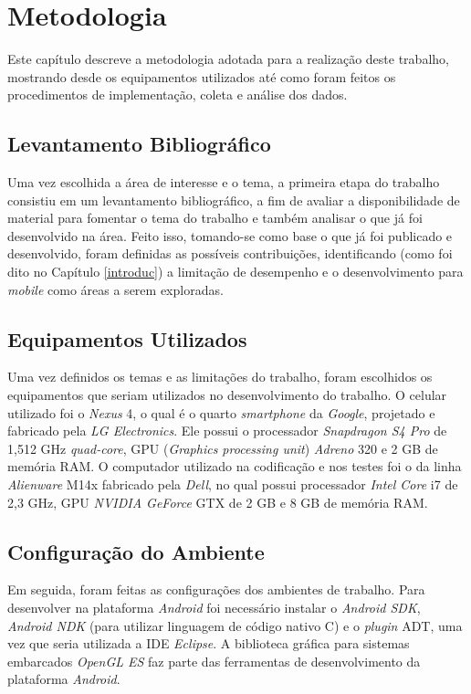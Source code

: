 \chapter[Metodologia]{Metodologia}

	Este capítulo descreve a metodologia adotada para a realização deste trabalho, mostrando desde os equipamentos utilizados até como foram feitos os procedimentos de implementação, coleta e análise dos dados. 

\section{Levantamento Bibliográfico}

Uma vez escolhida a área de interesse e o tema, a primeira etapa do trabalho consistiu em um levantamento bibliográfico, a fim de avaliar a disponibilidade de material para fomentar o tema do trabalho e também analisar o que já foi desenvolvido na área. Feito isso, tomando-se como base o que já foi publicado e desenvolvido, foram definidas as possíveis contribuições, identificando (como foi dito no Capítulo \ref{introduc}) a limitação de desempenho e o desenvolvimento para \textit{mobile} como áreas a serem exploradas.  

\section{Equipamentos Utilizados}

	Uma vez definidos os temas e as limitações do trabalho, foram escolhidos os equipamentos que seriam utilizados no desenvolvimento do trabalho. O celular utilizado foi o \textit{Nexus} 4, o qual é o quarto  \textit{smartphone} da  \textit{Google}, projetado e fabricado pela \textit{LG Electronics}.  Ele possui o processador \textit{Snapdragon S4 Pro} de 1,512 GHz \textit{quad-core}, GPU (\textit{Graphics processing unit}) \textit{Adreno} 320 e 2 GB de memória RAM. O computador utilizado na codificação e nos testes foi o da linha \textit{Alienware} M14x fabricado pela \textit{Dell}, no qual possui processador \textit{Intel Core} i7 de 2,3 GHz, GPU \textit{NVIDIA GeForce} GTX de 2 GB e 8 GB de memória RAM. 

\section{Configuração do Ambiente}
\label{configamb}	

	Em seguida, foram feitas as configurações dos ambientes de trabalho. Para desenvolver na plataforma \textit{Android} foi necessário instalar o \textit{Android SDK}, \textit{Android NDK} (para utilizar linguagem de código nativo C) e o \textit{plugin} ADT, uma vez que seria utilizada a IDE \textit{Eclipse}. A biblioteca gráfica para sistemas embarcados \textit{OpenGL ES} faz parte das ferramentas de desenvolvimento da plataforma \textit{Android}. 

